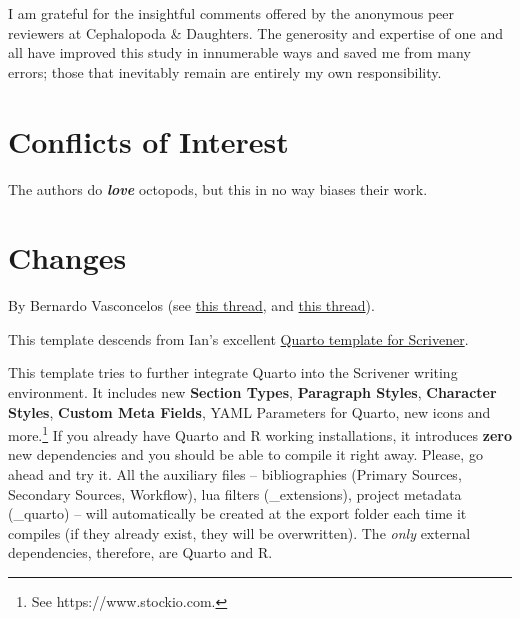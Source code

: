 \documentclass[
  12pt,
  a4paper,
  oneside,
  titlepage,
  toclink=all,
  toc=bibliography]{scrbook}
\theoremstyle{definition}
\theoremstyle{definition}
\theoremstyle{plain}
\theoremstyle{definition}
\theoremstyle{plain}
\theoremstyle{plain}
\theoremstyle{plain}
\theoremstyle{plain}
\theoremstyle{remark}
\begin{document}
I am grateful for the insightful comments offered by the anonymous peer
reviewers at Cephalopoda \& Daughters. The generosity and expertise of
one and all have improved this study in innumerable ways and saved me
from many errors; those that inevitably remain are entirely my own
responsibility.

\hypertarget{sec-scriv180}{%
\chapter{Conflicts of Interest}\label{sec-scriv180}}

The authors do \textbf{\emph{love}} octopods, but this in no way biases
their work.

\hypertarget{sec-scriv181}{%
\chapter{Changes}\label{sec-scriv181}}

\protect\hypertarget{scriv181}{}{}

By Bernardo Vasconcelos (see
\href{forum.literatureandlatte.com/t/scrivener-quarto-cite-tools-advanced-bibliography-for-a-technical-academic-publishing-workflow/133803}{this
thread}, and \href{forum.literatureandlatte.com/t/134755}{this thread}).

This template descends from Ian's excellent
\href{forum.literatureandlatte.com/t/scrivener-quarto-a-technical-academic-publishing-workflow/129769}{Quarto
template for Scrivener}.

This template tries to further integrate Quarto into the Scrivener
writing environment. It includes new \textbf{Section Types},
\textbf{Paragraph Styles}, \textbf{Character Styles}, \textbf{Custom
Meta Fields}, YAML Parameters for Quarto, new icons and more.\footnote{See
  https://www.stockio.com.} If you already have Quarto and R working
installations, it introduces \textbf{zero} new dependencies and you
should be able to compile it right away. Please, go ahead and try it.
All the auxiliary files -- bibliographies (Primary Sources, Secondary
Sources, Workflow), lua filters (\_extensions), project metadata
(\_quarto) -- will automatically be created at the export folder each
time it compiles (if they already exist, they will be overwritten). The
\emph{only} external dependencies, therefore, are Quarto and R.
\end{document}

